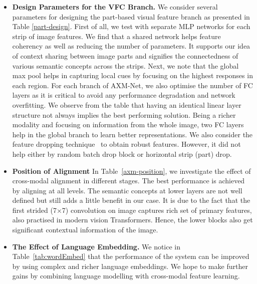 \documentclass[letterpaper]{article} \usepackage{aaai22}  \usepackage{times}  \usepackage{helvet}  \usepackage{courier}  \usepackage[hyphens]{url}  \usepackage{graphicx} \urlstyle{rm} \def\UrlFont{\rm}  \usepackage{natbib}  \usepackage{caption} \DeclareCaptionStyle{ruled}{labelfont=normalfont,labelsep=colon,strut=off} \frenchspacing  \setlength{\pdfpagewidth}{8.5in}  \setlength{\pdfpageheight}{11in}  \usepackage{algorithm}
\begin{document}
\begin{itemize}
    \item \textbf{Design Parameters for the VFC Branch.}
    We consider several parameters for designing the part-based visual feature branch as presented in Table \ref{part-design}. First of all, we test with separate MLP networks for each strip of image features. We find that a shared network helps feature coherency as well as reducing the number of parameters. It supports our idea of context sharing between image parts and signifies the connectedness of various semantic concepts across the strips. Next, we note that the global max pool helps in capturing local cues by focusing on the highest responses in each region. For each branch of AXM-Net, we also optimise the number of FC layers as it is critical to avoid any performance degradation and network overfitting. We observe from the table that having an identical linear layer structure not always implies the best performing solution. Being a richer modality and focusing on information from the whole image, two FC layers help in the global branch to learn better representations. We also consider the feature dropping technique~\cite{dai2019batch} to obtain robust features. However, it did not help either by random batch drop block or horizontal strip (part) drop. 
    \item \textbf{Position of Alignment} In Table~\ref{axm-position}, we investigate the effect of cross-modal alignment in different stages. The best performance is achieved by aligning at all levels. The semantic concepts at lower layers are not well defined but still adds a little benefit in our case. It is due to the fact that the first strided (7$\times$7) convolution on image captures rich set of primary features, also practised in modern vision Transformers. Hence, the lower blocks also get significant contextual information of the image. 
\begin{table}[!htbp]
\center 
{}
\caption{Effect of implicit alignment in different blocks.}
\label{axm-position}
\end{table}

    \item \textbf{The Effect of Language Embedding.} We notice in Table~\ref{tab:wordEmbed} that the performance of the system can be improved by using complex and richer language embeddings. We hope to make further gains by combining language modelling with cross-modal feature learning.
    \end{itemize}
\end{document}
